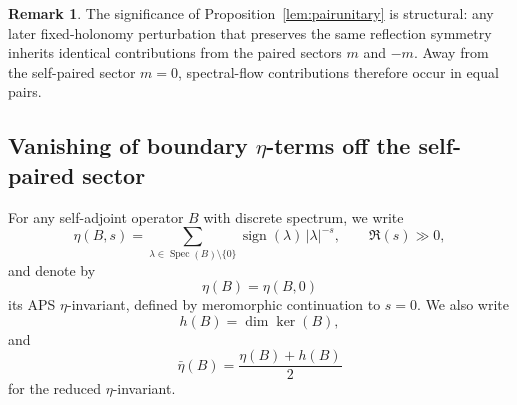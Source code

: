 \documentclass[11pt]{article}
\theoremstyle{definition}
\newtheorem{remark}[remark]{Remark}
\DeclareMathOperator{\Spec}{Spec}
\DeclareMathOperator{\sign}{sign}
\numberwithin{equation}{section}
\begin{document}
\begin{remark}\label{rem:sec4_evenness_bridge}
The significance of Proposition~\ref{lem:pairunitary} is structural: any later fixed-holonomy perturbation that preserves the same reflection symmetry inherits identical contributions from the paired sectors \(m\) and \(-m\). Away from the self-paired sector \(m=0\), spectral-flow contributions therefore occur in equal pairs.
\end{remark}

\subsection{Vanishing of boundary \texorpdfstring{$\eta$}{eta}-terms off the self-paired sector}



For any self-adjoint operator \(B\) with discrete spectrum, we write
\begin{equation}\label{eq:eta_definition_local}
\eta(B,s)=\sum_{\lambda\in\Spec(B)\setminus\{0\}}\sign(\lambda)\,|\lambda|^{-s},
\qquad
\Re(s)\gg 0,
\end{equation}
and denote by
\begin{equation}\label{eq:eta_at_zero_local}
\eta(B)=\eta(B,0)
\end{equation}
its APS \(\eta\)-invariant, defined by meromorphic continuation to \(s=0\). We also write
\begin{equation}\label{eq:h_definition_local}
h(B)=\dim\ker(B),
\end{equation}
and
\begin{equation}\label{eq:reduced_eta_definition_local}
\bar\eta(B)=\frac{\eta(B)+h(B)}{2}
\end{equation}
for the reduced \(\eta\)-invariant.
\end{document}
